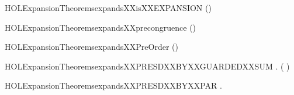 \begin{SaveVerbatim}{HOLExpansionTheoremsexpandsXXisXXEXPANSION}
\HOLTokenTurnstile{}  ()
\end{SaveVerbatim}
\newcommand{\HOLExpansionTheoremsexpandsXXisXXEXPANSION}{\UseVerbatim{HOLExpansionTheoremsexpandsXXisXXEXPANSION}}
\begin{SaveVerbatim}{HOLExpansionTheoremsexpandsXXprecongruence}
\HOLTokenTurnstile{}  ()
\end{SaveVerbatim}
\newcommand{\HOLExpansionTheoremsexpandsXXprecongruence}{\UseVerbatim{HOLExpansionTheoremsexpandsXXprecongruence}}
\begin{SaveVerbatim}{HOLExpansionTheoremsexpandsXXPreOrder}
\HOLTokenTurnstile{}  ()
\end{SaveVerbatim}
\newcommand{\HOLExpansionTheoremsexpandsXXPreOrder}{\UseVerbatim{HOLExpansionTheoremsexpandsXXPreOrder}}
\begin{SaveVerbatim}{HOLExpansionTheoremsexpandsXXPRESDXXBYXXGUARDEDXXSUM}
\HOLTokenTurnstile{} \HOLSymConst{\HOLTokenForall{}}     .
          \HOLSymConst{\HOLTokenConj{}}    \HOLSymConst{\HOLTokenImp{}}
        \HOLSymConst{+}   ( \HOLSymConst{+} )
\end{SaveVerbatim}
\newcommand{\HOLExpansionTheoremsexpandsXXPRESDXXBYXXGUARDEDXXSUM}{\UseVerbatim{HOLExpansionTheoremsexpandsXXPRESDXXBYXXGUARDEDXXSUM}}
\begin{SaveVerbatim}{HOLExpansionTheoremsexpandsXXPRESDXXBYXXPAR}
\HOLTokenTurnstile{} \HOLSymConst{\HOLTokenForall{}}   .
          \HOLSymConst{\HOLTokenConj{}}    \HOLSymConst{\HOLTokenImp{}}
        \HOLSymConst{\ensuremath{\parallel}}    \HOLSymConst{\ensuremath{\parallel}} 
\end{SaveVerbatim}
